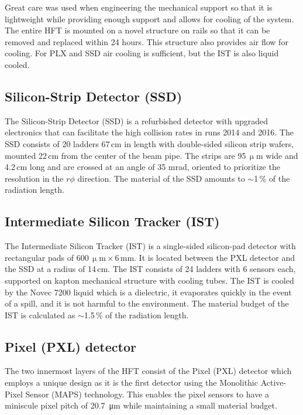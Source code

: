 Great care was used when engineering the mechanical support so that it is lightweight while providing enough support and allows for cooling of the system. The entire HFT is mounted on a novel structure on rails so that it can be removed and replaced within 24 hours. This structure also provides air flow for cooling. For PLX and SSD  air cooling is sufficient, but the IST is also liquid cooled.

\subsection{Silicon-Strip Detector (SSD)}

The Silicon-Strip Detector (SSD) is a refurbished detector with upgraded electronics that can facilitate the high collision rates in runs 2014 and 2016\@. The SSD consists of 20 ladders 67$\,$cm in length with double-sided silicon strip wafers, mounted 22$\,$cm from the center of the beam pipe. The strips are 95$\,\upmu$m wide and 4.2$\,$cm long and are crossed at an angle of 35 mrad, oriented to prioritize the resolution in the $r\phi$ direction. The material of the SSD amounts to $\sim$1$\,\%$ of the radiation length.

\subsection{Intermediate Silicon Tracker (IST)}

The Intermediate Silicon Tracker (IST) is a single-sided silicon-pad detector with rectangular pads of $600\,\upmu\mathrm{m}\times6\,$mm. It is located between the PXL detector and the SSD at a radius of 14$\,$cm. The IST consists of 24 ladders with 6 sensors each, supported on kapton mechanical structure with cooling tubes. The IST is cooled by the Novec 7200 liquid which is a dielectric, it evaporates quickly in the event of a spill, and it is not harmful to the environment. The material budget of the IST is calculated as $\sim$1.5$\,\%$ of the radiation length.

\subsection{Pixel (PXL) detector}
The two innermost layers of the HFT consist of the Pixel (PXL) detector which employs a unique design as it is the
first detector using the Monolithic Active-Pixel Sensor (MAPS)
technology. This enables the pixel sensors to have a miniscule pixel pitch of \SI{20.7}{\micro\metre} while maintaining
a small material budget.

